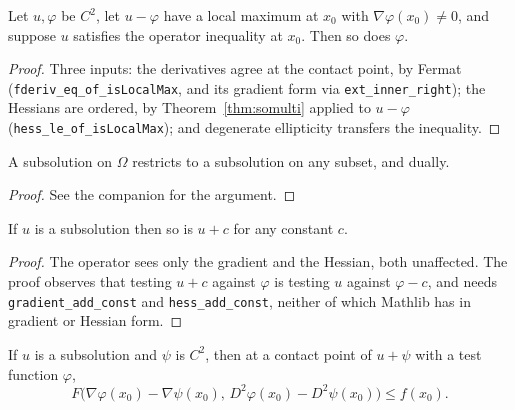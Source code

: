 \begin{theorem}\label{thm:consistency}
\leanok
{}
Let $u, \varphi$ be $C^2$, let $u - \varphi$ have a local maximum at $x_0$ with
$\nabla\varphi(x_0) \ne 0$, and suppose $u$ satisfies the operator inequality
at $x_0$. Then so does $\varphi$.
\end{theorem}

\begin{proof}
\leanok
{}
Three inputs: the derivatives agree at the contact point, by Fermat
(\texttt{fderiv\_eq\_of\_isLocalMax}, and its gradient form via
\texttt{ext\_inner\_right}); the Hessians are ordered, by
Theorem~\ref{thm:somulti} applied to $u - \varphi$
(\texttt{hess\_le\_of\_isLocalMax}); and degenerate ellipticity transfers the
inequality.
\end{proof}


\begin{theorem}\label{thm:stab-mono}
\leanok
{}
A subsolution on $\Omega$ restricts to a subsolution on any subset, and dually.
\end{theorem}

\begin{proof}
\leanok
See the companion for the argument.
\end{proof}


\begin{theorem}\label{thm:stab-const}
\leanok
{}
If $u$ is a subsolution then so is $u + c$ for any constant $c$.
\end{theorem}

\begin{proof}
\leanok
The operator sees only the gradient and the Hessian, both unaffected. The proof
observes that testing $u+c$ against $\varphi$ is testing $u$ against
$\varphi - c$, and needs \texttt{gradient\_add\_const} and
\texttt{hess\_add\_const}, neither of which Mathlib has in gradient or Hessian
form.
\end{proof}


\begin{theorem}\label{thm:stab-smooth}
\leanok
{}
If $u$ is a subsolution and $\psi$ is $C^2$, then at a contact point of
$u + \psi$ with a test function $\varphi$,
\[
  F\bigl(\nabla\varphi(x_0) - \nabla\psi(x_0),\,
    D^2\varphi(x_0) - D^2\psi(x_0)\bigr) \le f(x_0).
\]
\end{theorem}


